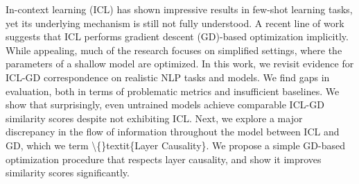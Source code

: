 In-context learning (ICL) has shown impressive results in few-shot learning tasks, yet its underlying mechanism is still not fully understood. A recent line of work suggests that ICL performs gradient descent (GD)-based optimization implicitly. While appealing, much of the research focuses on simplified settings, where the parameters of a shallow model are optimized. In this work, we revisit evidence for ICL-GD correspondence on realistic NLP tasks and models.  We find gaps in evaluation, both in terms of problematic metrics and insufficient baselines. We show that surprisingly, even untrained models achieve comparable ICL-GD similarity scores despite not exhibiting ICL. Next, we explore a major discrepancy in the flow of information throughout the model between ICL and GD, which we term \textbackslash\{\}textit\{Layer Causality\}. We propose a simple GD-based optimization procedure that respects layer causality, and show it improves similarity scores significantly.